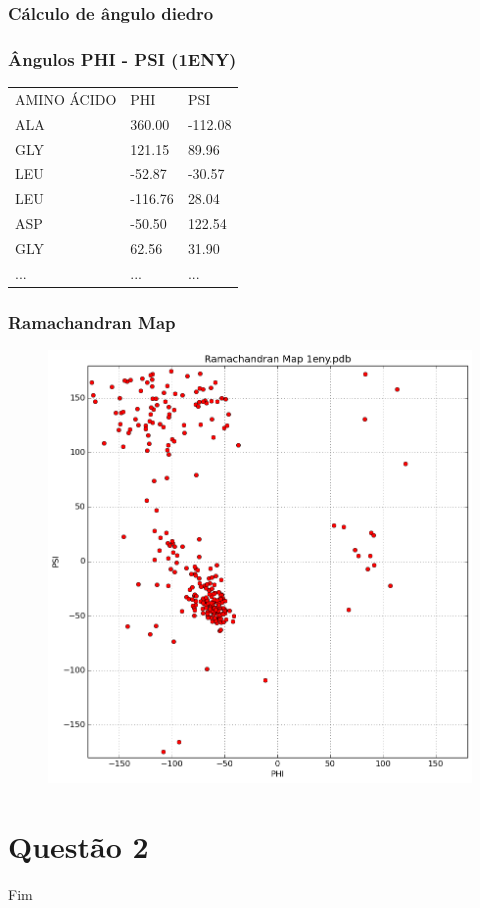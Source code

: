 \documentclass{beamer}
\begin{document}
\begin{frame}
\frametitle{Cálculo de ângulo diedro}

\end{frame}

\begin{frame}
\frametitle{Ângulos PHI - PSI (1ENY)}
\begin{table}[]
\centering
\label{my-label}
\begin{tabular}{lll}
AMINO ÁCIDO &  PHI     &  PSI    \\
ALA         &  360.00  & -112.08 \\
GLY         &  121.15  &  89.96  \\
LEU         & -52.87   & -30.57  \\
LEU         & -116.76  &  28.04  \\
ASP         & -50.50   &  122.54 \\
GLY         &  62.56   &  31.90  \\
...         & ...      & ...     
\end{tabular}
\end{table}
\end{frame}

\begin{frame}
\frametitle{Ramachandran Map}
\begin{figure}
\includegraphics[width=0.6\linewidth]{1eny.png}
\end{figure}
\end{frame}

\section{Questão 2} 



\begin{frame}
\Huge{\centerline{Fim}}
\end{frame}

\end{document}
